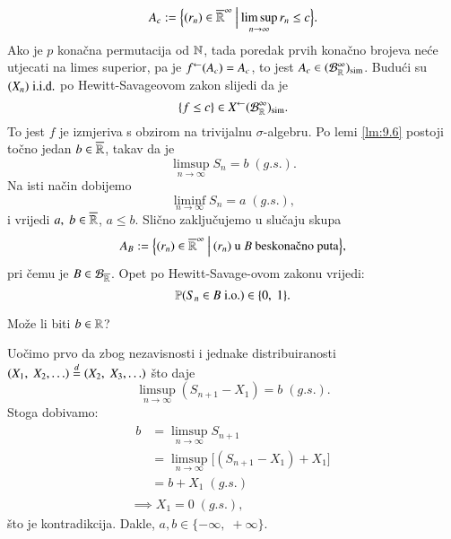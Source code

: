 \begin{pr}
    \begin{equation*}
        A_c := \Big\{ {(r_n) \in \overline{\mathbb{R}}^\infty} \: \Big| \: {\limsup\limits_{n \to \infty} r_n \leq c} \Big\}.
    \end{equation*}
    Ako je $p$ kona\v cna permutacija od $\mathbb{N}$, tada poredak prvih kona\v cno brojeva ne\' ce utjecati na limes superior, pa je ${f}^{\leftarrow} (A_c) = A_c$, to jest $A_c \in (\mathcal{B}_{\mathbb{R}}^\infty)_{\mathrm{sim}}$.
    Budu\' ci su $(X_n) \; \mathrm{i.i.d.}$ po Hewitt-Savageovom zakon slijedi da je
    \begin{equation*}
        \{f \leq c\} \in {X}^{\leftarrow} (\mathcal{B}_{\mathbb{R}}^\infty)_{\mathrm{sim}}.
    \end{equation*}
    To jest $f$ je izmjeriva s obzirom na trivijalnu $\sigma$-algebru.
    Po lemi \ref{lm:9.6} postoji to\v cno jedan $b \in \overline{\mathbb{R}}$, takav da je
    \begin{equation*}
        \limsup\limits_{n \to \infty} S_n = b \; (g.s.).
    \end{equation*}
    Na isti na\v cin dobijemo
    \begin{equation*}
        \liminf\limits_{n \to \infty} S_n = a \; (g.s.),
    \end{equation*}
    i vrijedi $a, \; b \in \overline{\mathbb{R}}$, $a \leq b$.
    Sli\v cno zaklju\v cujemo u slu\v caju skupa
    \begin{equation*}
        A_B := \bigSkup{(r_n) \in \extReal^\infty}{(r_n) \textnormal{ u $B$ beskona\v cno puta}},
    \end{equation*}
    pri \v cemu je $B \in \mathcal{B}_{\overline{\mathbb{R}}}$.
    Opet po Hewitt-Savage-ovom zakonu vrijedi:
    \begin{equation*}
        \mathbb{P}({S_n \in B \; \mathrm{i.o.}}) \in \{0, \; 1\}.
    \end{equation*}

    Mo\v ze li biti $b \in \mathbb{R}$?

    Uo\v cimo prvo da zbog nezavisnosti i jednake distribuiranosti $(X_1, \; X_2, \ldots) \overset{d}{=} (X_2, \; X_3, \ldots)$ \v sto daje 
    \begin{equation*}
        \limsup\limits_{n \to \infty} (S_{n + 1} - X_1) = b \; (g.s.).
    \end{equation*}
    Stoga dobivamo:
    \begin{equation*}
        \begin{gathered}
            \begin{aligned}
                b &= \limsup\limits_{n \to \infty} S_{n + 1}\\
                &= \limsup\limits_{n \to \infty} \big[ (S_{n + 1} - X_1) + X_1 \big]\\
                &= b + X_1 \; (g.s.)
            \end{aligned}\\
            \implies X_1 = 0 \; (g.s.),
        \end{gathered}
    \end{equation*}
    \v sto je kontradikcija.
    Dakle, $a, b \in \{-\infty, \; +\infty\}$.


\end{pr}

